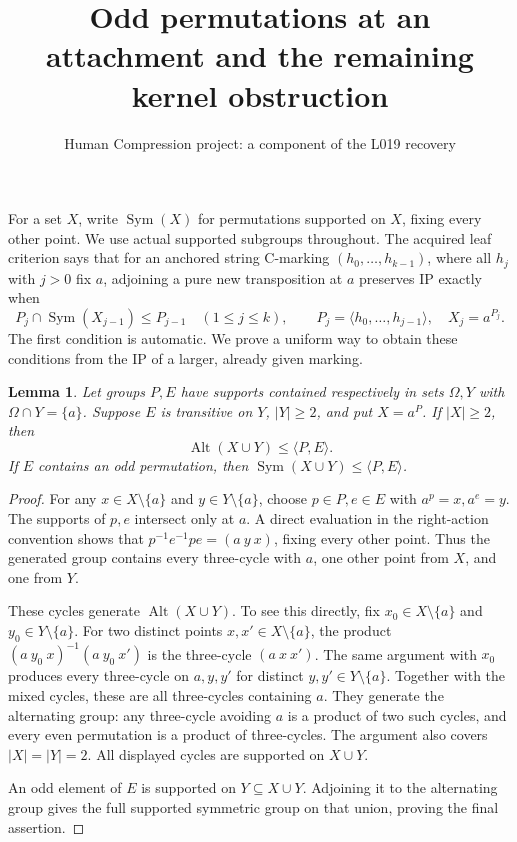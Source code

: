 \documentclass[11pt,a4paper]{article}
\title{Odd permutations at an attachment and the remaining kernel obstruction}
\author{Human Compression project: a component of the L019 recovery}
\date{}
\newtheorem{lemma}{Lemma}
\newcommand{\gen}[1]{\langle#1\rangle}
\newcommand{\Sym}{\operatorname{Sym}}
\newcommand{\Alt}{\operatorname{Alt}}
\begin{document}
\maketitle
For a set $X$, write $\Sym(X)$ for permutations supported on $X$,
fixing every other point. We use actual supported subgroups throughout.
The acquired leaf criterion says that for an anchored string C-marking
$(h_0,\ldots,h_{k-1})$, where all $h_j$ with $j>0$ fix $a$,
adjoining a pure new transposition at $a$ preserves IP exactly when
\[
 P_j\cap\Sym(X_{j-1})\le P_{j-1}\quad(1\le j\le k),
 \qquad P_j=\gen{h_0,\ldots,h_{j-1}},\quad X_j=a^{P_j}.
                                                               \tag{1}
\]
The first condition is automatic. We prove a uniform way to obtain
these conditions from the IP of a larger, already given marking.

\begin{lemma}\label{overlap}
Let groups $P,E$ have supports contained respectively in sets
$\Omega,Y$ with $\Omega\cap Y=\{a\}$. Suppose $E$ is transitive
on $Y$, $|Y|\ge2$, and put $X=a^P$. If $|X|\ge2$, then
\[
 \Alt(X\cup Y)\le\gen{P,E}.
\]
If $E$ contains an odd permutation, then
$\Sym(X\cup Y)\le\gen{P,E}$.
\end{lemma}
\begin{proof}
For any $x\in X\setminus\{a\}$ and $y\in Y\setminus\{a\}$,
choose $p\in P,e\in E$ with $a^p=x,a^e=y$.
The supports of $p,e$ intersect only at $a$. A direct evaluation
in the right-action convention shows that
$p^{-1}e^{-1}pe=(a\ y\ x)$, fixing every other point.
Thus the generated group contains every three-cycle with $a$,
one other point from $X$, and one from $Y$.

These cycles generate $\Alt(X\cup Y)$. To see this directly,
fix $x_0\in X\setminus\{a\}$ and $y_0\in Y\setminus\{a\}$.
For two distinct points $x,x'\in X\setminus\{a\}$, the product
$(a\ y_0\ x)^{-1}(a\ y_0\ x')$ is the three-cycle
$(a\ x\ x')$.
The same argument with $x_0$ produces every three-cycle on
$a,y,y'$ for distinct $y,y'\in Y\setminus\{a\}$.
Together with the mixed cycles, these are all three-cycles containing
$a$. They generate the alternating group: any three-cycle avoiding
$a$ is a product of two such cycles, and every even permutation is
a product of three-cycles. The argument also covers $|X|=|Y|=2$.
All displayed cycles are supported on $X\cup Y$.

An odd element of $E$ is supported on $Y\subseteq X\cup Y$.
Adjoining it to the alternating group gives the full supported
symmetric group on that union, proving the final assertion.
\end{proof}
\end{document}
